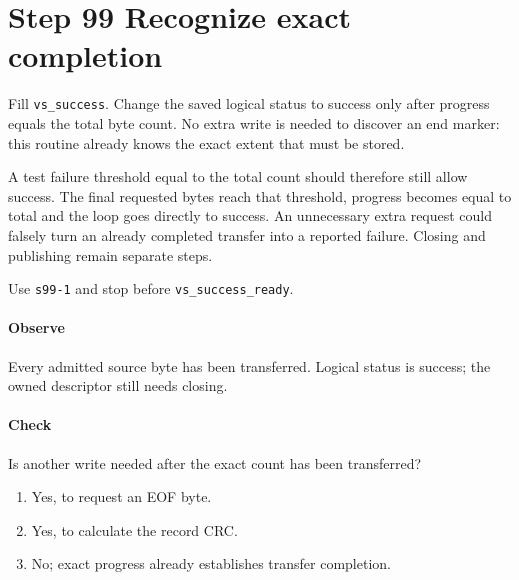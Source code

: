 \section{Step 99 Recognize exact completion}
Fill \texttt{vs\_success}. Change the saved logical status to success only after progress equals the total byte count. No extra write is needed to discover an end marker: this routine already knows the exact extent that must be stored.

A test failure threshold equal to the total count should therefore still allow success. The final requested bytes reach that threshold, progress becomes equal to total and the loop goes directly to success. An unnecessary extra request could falsely turn an already completed transfer into a reported failure. Closing and publishing remain separate steps.

Use \texttt{s99-1} and stop before \texttt{vs\_success\_ready}.

\paragraph{Observe} Every admitted source byte has been transferred. Logical status is success; the owned descriptor still needs closing.

\paragraph{Check} Is another write needed after the exact count has been transferred?
\begin{enumerate}[label=\Alph*.]
\item Yes, to request an EOF byte.
\item Yes, to calculate the record CRC.
\item No; exact progress already establishes transfer completion.
\end{enumerate}
